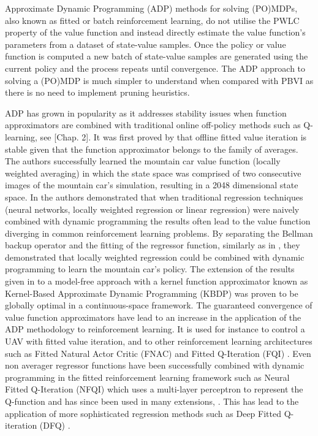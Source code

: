 \documentclass[final,5p,times,twocolumn]{elsarticle}
\begin{document}

Approximate Dynamic Programming (ADP) methods\cite{approx_rl_overview_2011} for solving (PO)MDPs, also known 
as fitted or batch reinforcement learning, do not utilise the PWLC property of the value function and 
instead directly estimate the value function's parameters from a dataset of state-value samples. 
Once the policy or value function is computed a new batch of state-value samples are generated using 
the current policy and the process repeats until convergence. The ADP approach to solving a (PO)MDP is much 
simpler to understand when compared with PBVI as there is no need to implement pruning heuristics.

ADP has grown in popularity as it addresses stability issues when function approximators are combined 
with traditional online off-policy methods such as Q-learning, see \cite{RL_state_art_2012}[Chap. 2].
It was first proved by \cite{stable_FA_gordon_1995} that offline fitted value iteration is stable given that 
the function approximator belongs to the family of averages. The authors successfully learned the mountain car value
function (locally weighted averaging) in which the state space was comprised of two consecutive images of the mountain car's 
simulation, resulting in a 2048 dimensional state space. 
In \cite{Boyan95generalizationin} the authors demonstrated that when traditional regression techniques 
(neural networks, locally weighted regression or linear regression) were naively combined with dynamic programming  
the results often lead to the value function diverging in common reinforcement learning problems. By separating 
the Bellman backup operator and the fitting of the regressor function, similarly as in \cite{stable_FA_gordon_1995}, 
they demonstrated that locally weighted regression could be combined with dynamic programming to learn the mountain car's policy. 
The extension of the results given in \cite{stable_FA_gordon_1995} to a model-free approach with a kernel function 
approximator known as Kernel-Based Approximate Dynamic Programming (KBDP) \cite{kernel_rl_ormoneit_2002} was proven to 
be globally optimal in a continuous-space framework. The guaranteed convergence of value function approximators have
lead to an increase in the application of the ADP methodology to reinforcement learning. It is used for instance  
to control a UAV with fitted value iteration\cite{fvi_uav_2010}, and to 
other reinforcement learning architectures such as Fitted Natural Actor Critic (FNAC) \cite{Melo2008} and 
Fitted Q-Iteration (FQI) \cite{EGW05,fqi_nips_peter_2009}. Even non averager regressor functions have been successfully 
combined with dynamic programming in the fitted reinforcement learning framework such as 
Neural Fitted Q-Iteration (NFQI) \cite{Riedmiller2005} which uses a multi-layer perceptron to represent the Q-function 
and has since been used in many extensions, \cite{peter_nac_2008,rl_gmm_2010}. 
This has lead to the application of more sophisticated regression methods such as Deep Fitted Q-iteration (DFQ) 
\cite{Lange_riedmiller_2010,mnih-dqn-2015,DRQ_AAAI_2015}.
\end{document}
